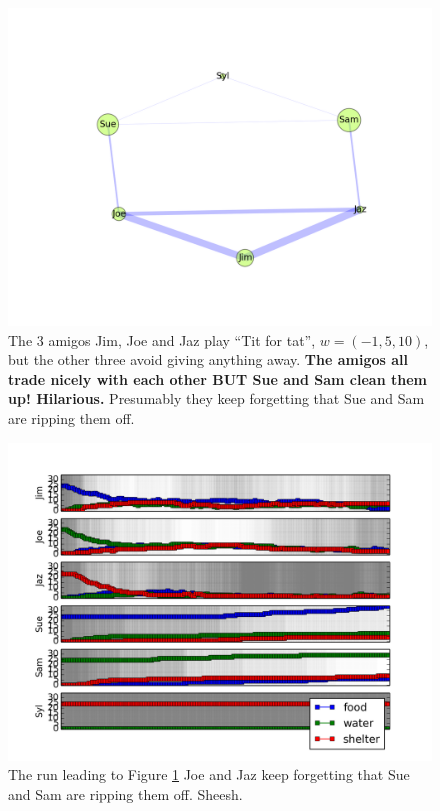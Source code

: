 \documentclass[11pt]{article}
\begin{document}
\begin{figure}[b]
\includegraphics[width=.85\textwidth]{twotribes_little_memory_result}
\caption{\label{fig:twotribes_little_memory_result} 
The 3 amigos Jim, Joe and Jaz play ``Tit for tat'', $w=(-1,5,10)$, but the other three avoid giving anything away. {\bf The amigos all trade nicely with each other BUT Sue and Sam clean them up! Hilarious.} Presumably they keep forgetting that Sue and Sam are ripping them off.}
\end{figure}

\begin{figure}[b]
\includegraphics[width=\textwidth]{twotribes_little_memory_seq}
\caption{\label{fig:twotribes_little_memory_seq} 
The run leading to Figure \ref{fig:twotribes_little_memory_result} 
Joe and Jaz keep forgetting that Sue and Sam are ripping them off. Sheesh.}
\end{figure}
\end{document}
